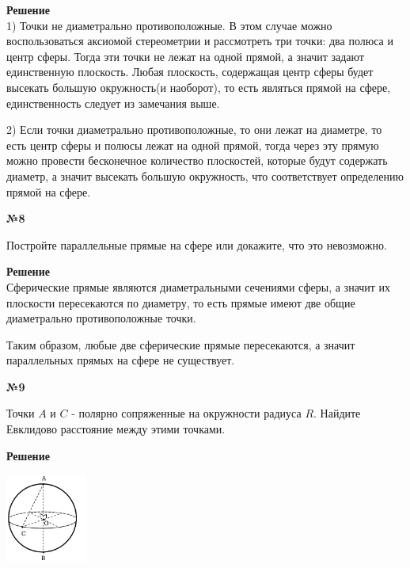    \textbf{Решение}\\

    1) Точки не диаметрально противоположные.
    В этом случае можно воспользоваться аксиомой стереометрии и рассмотреть три точки: два полюса и центр сферы.
    Тогда эти точки не лежат на одной прямой, а значит задают единственную плоскость.
    Любая плоскость, содержащая центр сферы будет высекать большую окружность(и наоборот), то есть являться прямой на сфере,
    единственность следует из замечания выше.

    2) Если точки диаметрально противоположные, то они лежат на диаметре, то есть центр сферы и полюсы лежат на одной прямой,
    тогда через эту прямую можно провести бесконечное количество плоскостей, которые будут содержать диаметр, а значит
    высекать большую окружность, что соответствует определению прямой на сфере.

    \begin{center}
        \textbf{№8}
    \end{center}

    Постройте параллельные прямые на сфере или докажите, что это невозможно.

    \textbf{Решение}\\

    Сферические прямые являются диаметральными сечениями сферы, а значит их
    плоскости пересекаются по диаметру, то есть прямые имеют две общие диаметрально
    противоположные точки.

    Таким образом, любые две сферические прямые пересекаются, а значит параллельных прямых на сфере не существует.

    \begin{center}
        \textbf{№9}
    \end{center}

    Точки $A$ и $C$ - полярно сопряженные на окружности радиуса $R$.
    Найдите Евклидово расстояние между этими точками.

    \textbf{Решение}\\

    \begin{center}
        \includegraphics[width=0.2\textwidth]{images/img2}\\
    \end{center}

